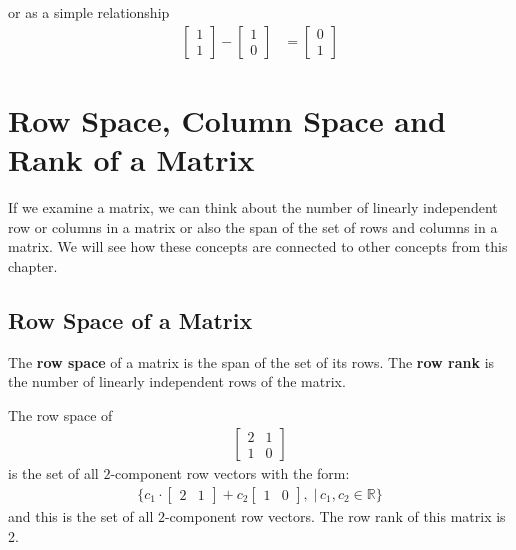 \begin{example}
or as a simple relationship
%
\begin{align*}
\begin{bmatrix}
1 \\ 1
\end{bmatrix} - \begin{bmatrix}
1 \\ 0
\end{bmatrix} & = \begin{bmatrix}
0 \\ 1
\end{bmatrix}
\end{align*}
\end{example}


\vfill \pagebreak

\section{Row Space, Column Space and Rank of a Matrix}
\label{sect:row:col:space:rank}

If we examine a matrix, we can think about the number of linearly independent row or columns in a matrix or also the span of the set of rows and columns in a matrix.  We will see how these concepts are connected to other concepts from this chapter.

\subsection{Row Space of a Matrix}

\begin{definition}
The \textbf{row space} of a matrix is the span of the set of its rows.  The \textbf{row rank} is the number of linearly independent rows of the matrix.
\end{definition}


\begin{example}
The row space of
%
\begin{align*}
\begin{bmatrix}
2 & 1 \\
1 & 0
\end{bmatrix}
\end{align*}
is the set of all $2$-component row vectors with the form:
%
\begin{align*}
\{ c_1 \cdot \begin{bmatrix}
2 & 1
\end{bmatrix} + c_2 \begin{bmatrix}
1 & 0
\end{bmatrix}, \; | \, c_1, c_2 \in \mathbb{R} \}
\end{align*}
and this is the set of all $2$-component row vectors.   The row rank of this matrix is 2.
\end{example}

